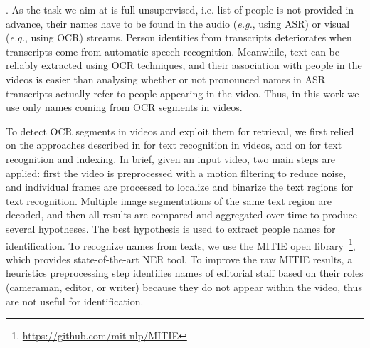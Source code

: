 . As the task we aim at is full unsupervised, i.e. list of people is not provided in advance, their names have to be found in the audio (\emph{e.g.}, using ASR) or visual (\emph{e.g.}, using OCR) streams.
%
%
Person identities from transcripts deteriorates when transcripts come from automatic speech recognition. Meanwhile, text can be reliably extracted using OCR techniques, and their association with people in the videos is easier than analysing whether or not pronounced names in ASR transcripts actually refer to people appearing in the video. Thus, in this work we use only names coming from OCR segments in videos.

To detect OCR segments in videos and exploit them for retrieval, we first relied on the approaches described in \cite{chen-pr04,odobez-prl05} for text recognition in videos, and on \cite{daddaoua:ICDAR:05,vincia:tmm:05} for text recognition and indexing.
%
In brief, given an input video, two main steps are applied: first the video is preprocessed with a motion filtering to reduce noise, and individual frames are processed to localize and binarize the text regions for text recognition.
%
%
Multiple image segmentations of the same text region are decoded, and then all results are compared and aggregated over time to produce several hypotheses. 
%
The best hypothesis is used to extract people names for identification. To recognize names from texts, we use the MITIE open library~\footnote{\url{https://github.com/mit-nlp/MITIE}}, which provides state-of-the-art NER tool. 
%
%
To improve the raw MITIE results, a heuristics preprocessing step identifies names of editorial staff based on their roles (cameraman, editor, or writer) because they do not appear within the video, thus are not useful for identification.

